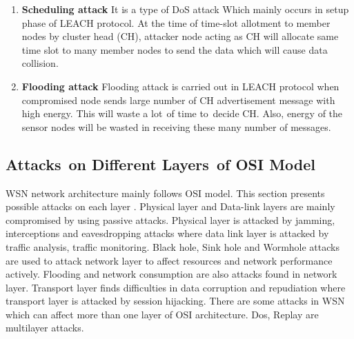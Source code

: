 \begin{enumerate}[label=\textbf{\roman*.}]
    \item \textbf{Scheduling attack }\cite{almomani2015performance} It is a type of DoS attack Which mainly occurs in setup phase of LEACH protocol. At the time of time-slot allotment to member nodes by cluster head (CH), attacker node acting as CH will allocate same time slot to many member nodes to send the data which will cause data collision.
    
    \item \textbf{Flooding attack }\cite{almomani2015performance} Flooding attack is carried out in LEACH protocol when compromised node sends large number of CH advertisement message with high energy. This will waste a lot\textcolor{white}{e}of time to\textcolor{white}{e}decide CH. Also, energy of the sensor nodes will be wasted in receiving these many number of messages.
\end{enumerate}

\subsection{Attacks\textcolor{white}{e}on Different Layers\textcolor{white}{e}of OSI Model}
WSN network architecture mainly follows OSI model. This section presents possible attacks on each layer \cite{lupu2009main}. Physical layer and Data-link layers are mainly compromised by using passive attacks. Physical layer is attacked by jamming, interceptions and eavesdropping attacks where data link layer is attacked by traffic analysis, traffic monitoring. Black hole, Sink hole and Wormhole attacks are used to attack network layer to affect resources and network performance actively. Flooding and network consumption are also attacks found in network layer. Transport layer finds difficulties in data corruption and repudiation where transport layer is attacked by session hijacking. There are some attacks in WSN which can affect more than one layer of OSI architecture. Dos, Replay are multilayer attacks.

